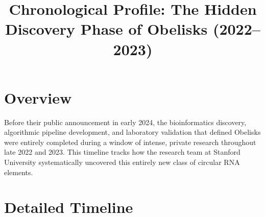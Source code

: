 \documentclass[11pt,a4paper]{article}
\title{Chronological Profile: The Hidden Discovery Phase of Obelisks (2022--2023)}
\author{}
\date{}
\begin{document}
\maketitle

\section*{Overview}
Before their public announcement in early 2024, the bioinformatics discovery, algorithmic pipeline development, and laboratory validation that defined Obelisks were entirely completed during a window of intense, private research throughout late 2022 and 2023. This timeline tracks how the research team at Stanford University systematically uncovered this entirely new class of circular RNA elements.

\section*{Detailed Timeline}
\end{document}
